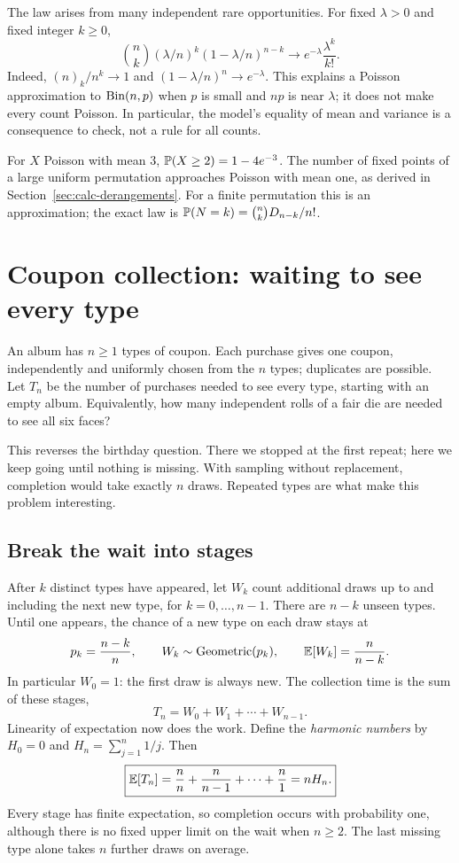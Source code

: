 The law arises from many independent rare opportunities. For fixed
$\lambda>0$ and fixed integer $k\ge0$,
\[
 \binom nk(\lambda/n)^k(1-\lambda/n)^{n-k}
 \longrightarrow e^{-\lambda}\frac{\lambda^k}{k!}.
\]
Indeed, $(n)_k/n^k\to1$ and $(1-\lambda/n)^n\to e^{-\lambda}$.
This explains a Poisson approximation to $\Bin(n,p)$ when $p$ is small
and $np$ is near $\lambda$; it does not make every count Poisson.
In particular, the model's equality of mean and variance is a consequence
to check, not a rule for all counts.

For $X$ Poisson with mean $3$, $\P(X\ge2)=1-4e^{-3}$.
The number of fixed points of a large uniform permutation approaches
Poisson with mean one, as derived in
Section~\ref{sec:calc-derangements}.
For a finite permutation this is an approximation; the exact law is
$\P(N=k)=\binom nkD_{n-k}/n!$.

\section{Coupon collection: waiting to see every type}
\label{sec:coupon-collector}

An album has $n\ge1$ types of coupon. Each purchase gives one coupon,
independently and uniformly chosen from the $n$ types; duplicates are
possible. Let $T_n$ be the number of purchases needed to see every type,
starting with an empty album. Equivalently, how many independent rolls
of a fair die are needed to see all six faces?

This reverses the birthday question. There we stopped at the first
repeat; here we keep going until nothing is missing.
With sampling without replacement, completion would take exactly $n$
draws. Repeated types are what make this problem interesting.

\subsection*{Break the wait into stages}
After $k$ distinct types have appeared, let $W_k$ count additional draws
up to and including the next new type, for $k=0,\ldots,n-1$.
There are $n-k$ unseen types. Until one appears, the chance of a new type
on each draw stays at
\[
 p_k=\frac{n-k}{n},\qquad
 W_k\sim\text{Geometric}(p_k),\qquad
 \E[W_k]=\frac{n}{n-k}.
\]
In particular $W_0=1$: the first draw is always new.
The collection time is the sum of these stages,
\[
 T_n=W_0+W_1+\cdots+W_{n-1}.
\]
Linearity of expectation now does the work. Define the \emph{harmonic
numbers} by $H_0=0$ and $H_n=\sum_{j=1}^n1/j$. Then
\begin{equation}
 \boxed{\E[T_n]=\frac nn+\frac n{n-1}+\cdots+\frac n1=nH_n.}
 \label{eq:coupon-mean}
\end{equation}
Every stage has finite expectation, so completion occurs with probability
one, although there is no fixed upper limit on the wait when $n\ge2$.
The last missing type alone takes $n$ further draws on average.

